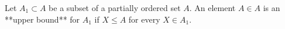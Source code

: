 Let $A_1 \subset A$ be a subset of a partially ordered set $A$. An element $A \in A$ is an **upper bound** for $A_1$ if $X \leq A$ for every $X \in A_1$.
